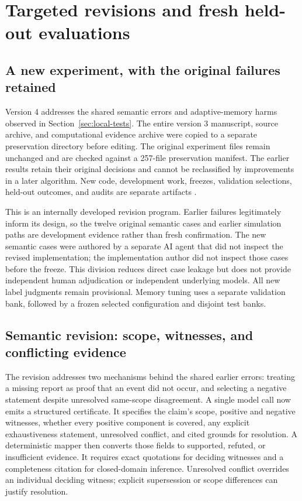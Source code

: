 \clearpage
\section{Targeted revisions and fresh held-out evaluations}
\label{sec:revisions}
\subsection{A new experiment, with the original failures retained}
Version 4 addresses the shared semantic errors and adaptive-memory harms observed in Section~\ref{sec:local-tests}. The entire version 3 manuscript, source archive, and computational evidence archive were copied to a separate preservation directory before editing. The original experiment files remain unchanged and are checked against a 257-file preservation manifest. The earlier results retain their original decisions and cannot be reclassified by improvements in a later algorithm. New code, development work, freezes, validation selections, held-out outcomes, and audits are separate artifacts \cite{revisiontests}.

This is an internally developed revision program. Earlier failures legitimately inform its design, so the twelve original semantic cases and earlier simulation paths are development evidence rather than fresh confirmation. The new semantic cases were authored by a separate AI agent that did not inspect the revised implementation; the implementation author did not inspect those cases before the freeze. This division reduces direct case leakage but does not provide independent human adjudication or independent underlying models. All new label judgments remain provisional. Memory tuning uses a separate validation bank, followed by a frozen selected configuration and disjoint test banks.

\subsection{Semantic revision: scope, witnesses, and conflicting evidence}
The revision addresses two mechanisms behind the shared earlier errors: treating a missing report as proof that an event did not occur, and selecting a negative statement despite unresolved same-scope disagreement. A single model call now emits a structured certificate. It specifies the claim's scope, positive and negative witnesses, whether every positive component is covered, any explicit exhaustiveness statement, unresolved conflict, and cited grounds for resolution. A deterministic mapper then converts those fields to supported, refuted, or insufficient evidence. It requires exact quotations for deciding witnesses and a completeness citation for closed-domain inference. Unresolved conflict overrides an individual deciding witness; explicit supersession or scope differences can justify resolution.


